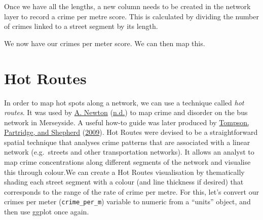 \documentclass[
  krantz2]{krantz}
\makeatletter
\newenvironment{Shaded}{\begin{snugshade}}{\end{snugshade}}
\newcommand{\FunctionTok}[1]{\textcolor[rgb]{0,0,0}{#1}}
\newcommand{\NormalTok}[1]{#1}
\newcommand{\OtherTok}[1]{\textcolor[rgb]{0.37,0.37,0.37}{#1}}
\newcommand{\SpecialCharTok}[1]{\textcolor[rgb]{0,0,0}{#1}}
\newenvironment{kframe}{%
\medskip{}
\setlength{\fboxsep}{.8em}
 \def\at@end@of@kframe{}%
 \ifinner\ifhmode%
  \def\at@end@of@kframe{\end{minipage}}%
  \begin{minipage}{\columnwidth}%
 \fi\fi%
 \def\FrameCommand##1{\hskip\@totalleftmargin \hskip-\fboxsep
 \colorbox{shadecolor}{##1}\hskip-\fboxsep
     \hskip-\linewidth \hskip-\@totalleftmargin \hskip\columnwidth}%
 \MakeFramed {\advance\hsize-\width
   \@totalleftmargin\z@ \linewidth\hsize
   \@setminipage}}%
 {\par\unskip\endMakeFramed%
 \at@end@of@kframe}
\renewenvironment{Shaded}{\begin{kframe}}{\end{kframe}}
\makeatother
\begin{document}
\begin{Shaded}
\end{Shaded}

Once we have all the lengths, a new column needs to be created in the network layer to record a crime per metre score. This is calculated by dividing the number of crimes linked to a street segment by its length.

\begin{Shaded}
\end{Shaded}

We now have our crimes per meter score. We can then map this.

\hypertarget{hot-routes}{%
\section{Hot Routes}\label{hot-routes}}

In order to map hot spots along a network, we can use a technique called \emph{hot routes}. It was used by \protect\hyperlink{ref-Newton_2008}{A. Newton} (\protect\hyperlink{ref-Newton_2008}{n.d.}) to map crime and disorder on the bus network in Merseyside. A useful how-to guide was later produced by \protect\hyperlink{ref-Tompson_2009}{Tompson, Partridge, and Shepherd} (\protect\hyperlink{ref-Tompson_2009}{2009}). Hot Routes were devised to be a straightforward spatial technique that analyses crime patterns that are associated with a linear network (e.g.~streets and other transportation networks). It allows an analyst to map crime concentrations along different segments of the network and visualise this through colour.We can create a Hot Routes visualisation by thematically shading each street segment with a colour (and line thickness if desired) that corresponds to the range of the rate of crime per metre. For this, let's convert our crimes per meter (\texttt{crime\_per\_m}) variable to numeric from a ``units'' object, and then use ggplot once again.
\end{document}
